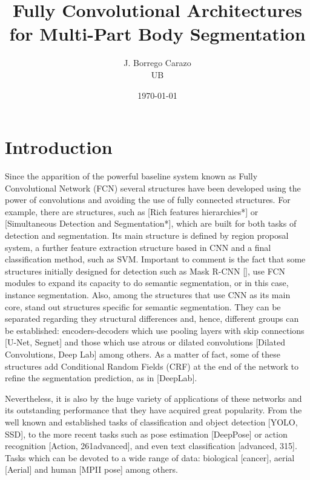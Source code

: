 \documentclass[12pt,a4paper]{article}
\title{Fully Convolutional Architectures for Multi-Part Body Segmentation}
\author{J. Borrego Carazo\\
UB}
\date{\today}
\begin{document}
\maketitle
\begin{abstract}

\end{abstract}
\newpage
\tableofcontents
\newpage

\section{Introduction}

Since the apparition of the powerful baseline system known as Fully Convolutional Network (FCN) several structures have been developed using the power of convolutions and avoiding the use of fully connected structures. For example, there are structures, such as [Rich features hierarchies*] or [Simultaneous Detection and Segmentation*], which are built for both tasks of detection and segmentation. Its main structure is defined by region proposal system, a further feature extraction structure based in CNN and a final classification method, such as SVM. Important to comment is the fact that some structures initially designed for detection such as Mask R-CNN [], use FCN modules to expand its capacity to do semantic segmentation, or in this case, instance segmentation. Also, among the structures that use CNN as its main core,  stand out structures specific for semantic segmentation. They can be separated regarding they structural differences and, hence, different groups can be established: encoders-decoders which use pooling layers with skip connections [U-Net, Segnet] and those which use atrous or dilated convolutions [Dilated Convolutions, Deep Lab] among others. As a matter of fact, some of these structures add Conditional Random Fields (CRF) at the end of the network to refine the segmentation prediction, as in [DeepLab].   \newline

Nevertheless, it is also by the huge variety of applications of these networks and its outstanding performance that they have acquired great popularity. From the well known and established tasks of classification and object detection [YOLO, SSD], to the more recent tasks such as pose estimation [DeepPose] or action recognition [Action, 261advanced], and even text classification [advanced, 315]. Tasks which can be devoted to a wide range of data: biological [cancer], aerial [Aerial] and human [MPII pose] among others.
\end{document}
